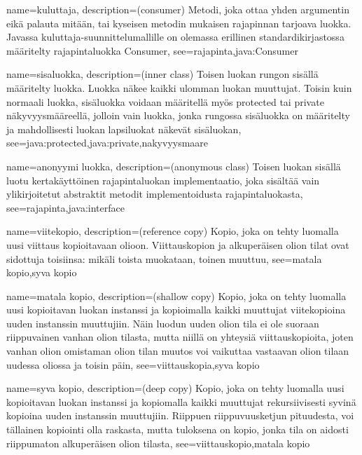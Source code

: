 {
	name=kuluttaja,
	description={(consumer) Metodi, joka ottaa yhden argumentin eikä palauta mitään, tai kyseisen
metodin mukaisen rajapinnan tarjoava luokka. Javassa kuluttaja-suunnittelumallille on olemassa
erillinen standardikirjastossa määritelty rajapintaluokka Consumer},
	see={rajapinta,java:Consumer}
}

{
	name=sisaluokka,
	description={(inner class) Toisen luokan rungon sisällä määritelty luokka. Luokka näkee
kaikki ulomman luokan muuttujat. Toisin kuin normaali luokka, sisäluokka voidaan määritellä myös
protected tai private näkyvyysmääreellä, jolloin vain luokka, jonka rungossa sisäluokka on
määritelty ja mahdollisesti luokan lapsiluokat näkevät sisäluokan},
	see={java:protected,java:private,nakyvyysmaare}
}

{
	name=anonyymi luokka,
	description={(anonymous class) Toisen luokan sisällä luotu kertakäyttöinen rajapintaluokan
implementaatio, joka sisältää vain ylikirjoitetut abstraktit metodit implementoidusta
rajapintaluokasta},
	see={rajapinta,java:interface}
}

{
	name=viitekopio,
	description={(reference copy) Kopio, joka on tehty luomalla uusi viittaus kopioitavaan olioon.
Viittauskopion ja alkuperäisen olion tilat ovat sidottuja toisiinsa: mikäli toista muokataan,
toinen muuttuu},
	see={matala kopio,syva kopio}
}

{
	name=matala kopio,
	description={(shallow copy) Kopio, joka on tehty luomalla uusi kopioitavan luokan instanssi
ja kopioimalla kaikki muuttujat viitekopioina uuden instanssin muuttujiin. Näin luodun uuden olion
tila ei ole suoraan riippuvainen vanhan olion tilasta, mutta niillä on yhteysiä viittauskopioita,
joten vanhan olion omistaman olion tilan muutos voi vaikuttaa vastaavan olion tilaan uudessa
oliossa ja toisin päin},
	see={viittauskopia,syva kopio}
}

{
	name=syva kopio,
	description={(deep copy) Kopio, joka on tehty luomalla uusi kopioitavan luokan instanssi ja
kopiomalla kaikki muuttujat rekursiivisesti syvinä kopioina uuden instanssin muuttujiin. Riippuen
riippuvuusketjun pituudesta, voi tällainen kopiointi olla raskasta, mutta tuloksena on kopio,
jonka tila on aidosti riippumaton alkuperäisen olion tilasta},
	see={viittauskopio,matala kopio}
}